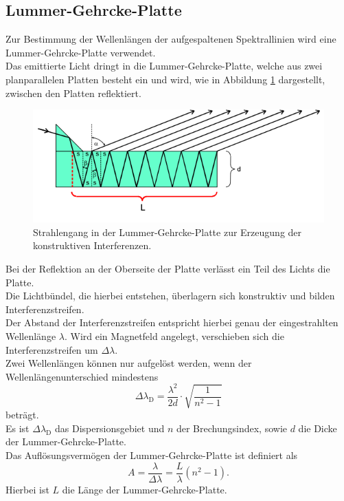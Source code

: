 \subsection{Lummer-Gehrcke-Platte}
Zur Bestimmung der Wellenlängen der aufgespaltenen Spektrallinien wird eine Lummer-Gehrcke-Platte verwendet.\\
Das emittierte Licht dringt in die Lummer-Gehrcke-Platte, welche aus zwei planparallelen Platten besteht ein und wird, wie in Abbildung \ref{fig:lummer} dargestellt, zwischen den Platten reflektiert.\\
\begin{figure}
  \centering
  \includegraphics[width=0.7\columnwidth]{pictures/lummer.png}
  \caption{Strahlengang in der Lummer-Gehrcke-Platte zur Erzeugung der konstruktiven Interferenzen.\cite{Anleitung}}
  \label{fig:lummer}
\end{figure}
Bei der Reflektion an der Oberseite der Platte verlässt ein Teil des Lichts die Platte.\\
Die Lichtbündel, die hierbei entstehen, überlagern sich konstruktiv und bilden Interferenzstreifen.\\ Der Abstand der Interferenzstreifen entspricht hierbei genau der eingestrahlten Wellenlänge $\lambda$.
Wird ein Magnetfeld angelegt, verschieben sich die Interferenzstreifen um $\Delta \lambda$.\\

Zwei Wellenlängen können nur aufgelöst werden, wenn der Wellenlängenunterschied mindestens
\begin{equation}
  \label{dispersionsgebiet}
	\Delta \lambda_{\mathrm{D}} = \frac{\lambda^2}{2d} \cdot \sqrt{\frac{1}{n^2 - 1}}
\end{equation}
beträgt.\\
Es ist $\Delta \lambda_{\mathrm{D}}$ das Dispersionsgebiet und $n$ der Brechungsindex, sowie $d$ die Dicke der Lummer-Gehrcke-Platte.\\
Das Auflösungsvermögen der Lummer-Gehrcke-Platte ist definiert als
\begin{equation}
  A=\frac{\lambda}{\Delta \lambda}=\frac{L}{\lambda}\left(n^2-1\right)\mathrm{.}
\end{equation}
Hierbei ist $L$ die Länge der Lummer-Gehrcke-Platte.
